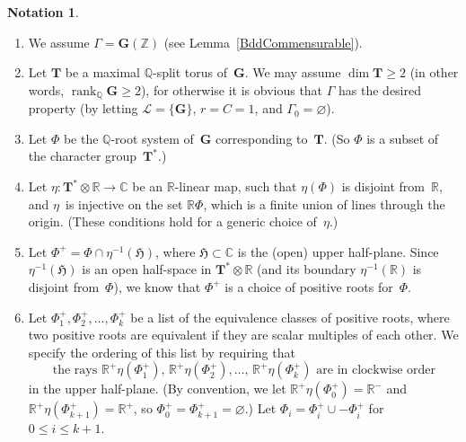 \documentclass[pdftex]{sigma}
\newcommand{\CC}{\mathbb{C}}
\newcommand{\QQ}{\mathbb{Q}}
\newcommand{\RR}{\mathbb{R}}
\newcommand{\ZZ}{\mathbb{Z}}
\newcommand{\Ga}{\mathbf{G}}
\newcommand{\Ta}{\mathbf{T}}
\DeclareMathOperator{\rank}{rank}
\newcommand{\hyper}{\mathfrak{H}}
\newcommand{\subgroups}{\mathcal{L}}
\numberwithin{equation}{section}
\theoremstyle{definition}
\newtheorem{notation}[thm]{Notation}
\begin{document}
\begin{notation} \label{QIBddGenNotation}\leavevmode
	\begin{enumerate}\itemsep=0pt
\item %
	We assume $\Gamma = \Ga(\ZZ)$ (see Lemma~\ref{BddCommensurable}).
\item %
	Let $\Ta$ be a maximal $\QQ$-split torus of~$\Ga$. We may assume $\dim \Ta \ge 2$ (in other words, $\rank_\QQ \Ga \ge 2$), for otherwise it is obvious that $\Gamma$ has the desired property (by letting $\subgroups = \{\Ga\}$, $r = C = 1$, and $\Gamma_0 = \varnothing$).
\item Let $\Phi$ be the $\QQ$-root system of~$\Ga$ corresponding to~$\Ta$.
	(So $\Phi$ is a subset of the character group~$\Ta^*$.)
\item Let $\eta \colon \Ta^* \otimes \RR \to \CC$ be an $\RR$-linear map, such that $\eta(\Phi)$ is disjoint from~$\RR$, and $\eta$~is injective on the set $\RR \Phi$, which is a finite union of lines through the origin. (These conditions hold for a generic choice of~$\eta$.)
\item Let $\Phi^+ = \Phi \cap \eta^{-1}(\hyper)$, where $\hyper \subset \CC$ is the (open) upper half-plane.
Since $\eta^{-1}(\hyper)$ is an open half-space in $\Ta^* \otimes \RR$ (and its boundary $\eta^{-1}(\RR)$ is disjoint from~$\Phi$), we know that $\Phi^+$ is a choice of positive roots for~$\Phi$.
\item Let $\Phi^+_1, \Phi^+_2,\ldots,\Phi^+_k$ be a list of the equivalence classes of positive roots, where two positive roots are equivalent if they are scalar multiples of each other. We specify the ordering of this list by requiring that
		\[ \text{the rays $\RR^+ \eta(\Phi^+_1)$, $\RR^+ \eta(\Phi^+_2), \ldots$, $\RR^+ \eta(\Phi^+_k)$ are in clockwise order} \]
	in the upper half-plane.
	(By convention, we let $\RR^+ \eta(\Phi^+_0) = \RR^-$ and $\RR^+ \eta(\Phi^+_{k+1}) = \RR^+$, so $\Phi^+_0 = \Phi^+_{k+1} = \varnothing$.)
	Let $\Phi_i = \Phi^+_i \cup - \Phi^+_i$ for $0 \le i \le k + 1$.
	

\end{enumerate}
\end{notation}
\end{document}
